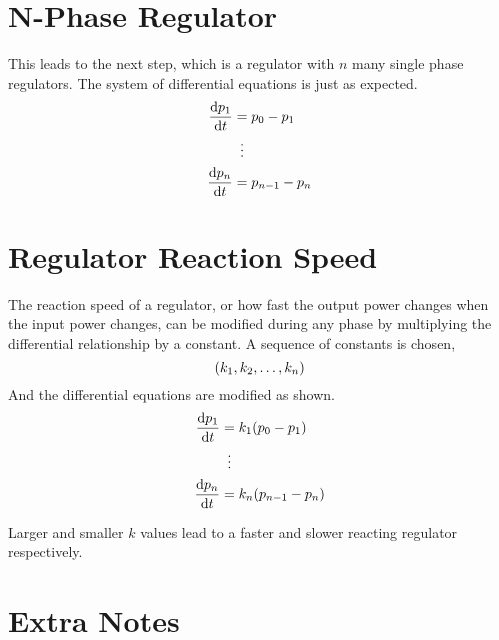 \documentclass[10pt,letterpaper,twocolumn]{article}
\begin{document}
	\section*{N-Phase Regulator}
	This leads to the next step, which is a regulator with $n$ many single phase regulators.
	The system of differential equations is just as expected.
	\begin{align*}
		\dv{p_1}{t} &= p_0 - p_1 \\
		&\vdotswithin{=} \\
		\dv{p_n}{t} &= p_{n-1} - p_n
	\end{align*}
	
	\section*{Regulator Reaction Speed}
	The reaction speed of a regulator, or how fast the output power changes when the input power changes, can be modified during any phase by multiplying the differential relationship by a constant.
	A sequence of constants is chosen,
	\[\qty(k_1, k_2, \dots, k_n)\]
	And the differential equations are modified as shown.
	\begin{align*}
		\dv{p_1}{t} &= k_1 \qty(p_0 - p_1) \\
		&\vdotswithin{=} \\
		\dv{p_n}{t} &= k_n \qty(p_{n-1} - p_n)
	\end{align*}
	
	Larger and smaller $k$ values lead to a faster and slower reacting regulator respectively.
	
	\section*{Extra Notes}
\end{document}
